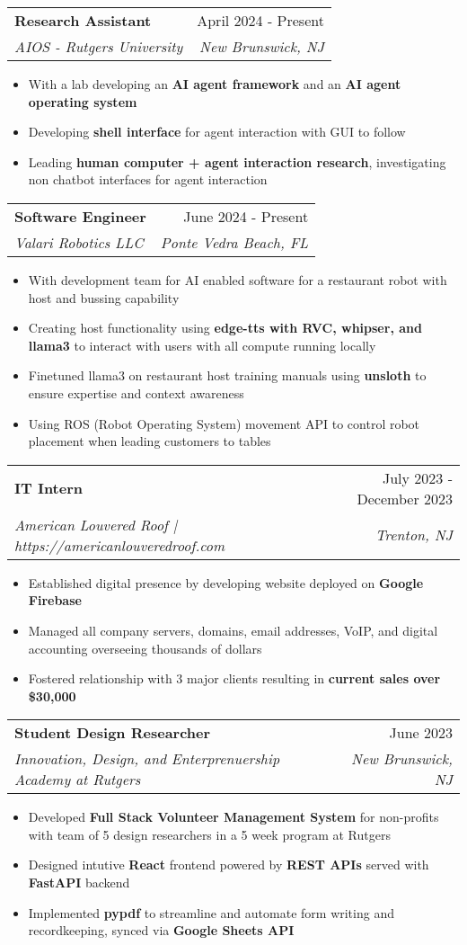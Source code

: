 \documentclass[letterpaper,10pt]{article}
\makeatletter
\newcommand{\resumeItem}[1]{
  \item\small{
    {#1 \vspace{-2pt}}
  }
}
\newcommand{\resumeSubheading}[4]{
  \vspace{-2pt}\item
    \begin{tabular*}{0.97\textwidth}[t]{l@{\extracolsep{\fill}}r}
      \textbf{#1} & #2 \\
      \textit{\small#3} & \textit{\small #4} \\
    \end{tabular*}\vspace{-7pt}
}
\newcommand{\resumeSubSubheading}[2]{
    \item
    \begin{tabular*}{0.97\textwidth}{l@{\extracolsep{\fill}}r}
      \textit{\small#1} & \textit{\small #2} \\
    \end{tabular*}\vspace{-7pt}
}
\newcommand{\resumeSubHeadingListEnd}{\end{itemize}}
\newcommand{\resumeItemListStart}{\begin{itemize}}
\newcommand{\resumeItemListEnd}{\end{itemize}\vspace{-5pt}}
\makeatother
\begin{document}
      
    \resumeSubheading
      {Research Assistant}{April 2024 - Present}
      {AIOS - Rutgers University}{New Brunswick, NJ}
      \resumeItemListStart
        \resumeItem{With a lab developing an \textbf{AI agent framework} and an \textbf{AI agent operating system}}
	\resumeItem{Developing \textbf{shell interface} for agent interaction with GUI to follow}
        \resumeItem{Leading \textbf{human computer + agent interaction research}, investigating non chatbot interfaces for agent interaction}
    \resumeItemListEnd

    \resumeSubheading
      {Software Engineer}{June 2024 - Present}
      {Valari Robotics LLC}{Ponte Vedra Beach, FL}
      \resumeItemListStart
        \resumeItem{With development team for AI enabled software for a restaurant robot with host and bussing capability}
	\resumeItem{Creating host functionality using \textbf{edge-tts with RVC, whipser, and llama3} to interact with users with all compute running locally}
        \resumeItem{Finetuned llama3 on restaurant host training manuals using \textbf{unsloth} to ensure expertise and context awareness}
        \resumeItem{Using ROS (Robot Operating System) movement API to control robot placement when leading customers to tables}
    \resumeItemListEnd

    \resumeSubheading
      {IT Intern}{July 2023 - December 2023}
      {American Louvered Roof  | https://americanlouveredroof.com}{Trenton, NJ}
      \resumeItemListStart
      \resumeItem{Established digital presence by developing website deployed on \textbf{Google Firebase}}
        \resumeItem{Managed all company servers, domains, email addresses, VoIP, and digital accounting overseeing thousands of dollars}
        \resumeItem{Fostered relationship with 3 major clients resulting in \textbf{current sales over \$30,000}}
    \resumeItemListEnd

    \resumeSubheading
      {Student Design Researcher}{June 2023}
      {Innovation, Design, and Enterprenuership Academy at Rutgers}{New Brunswick, NJ}
      \resumeItemListStart
      \resumeItem{Developed \textbf{Full Stack Volunteer Management System} for non-profits with team of 5 design researchers in a 5 week program at Rutgers}
      \resumeItem{Designed intutive \textbf{React} frontend powered by \textbf{REST APIs} served with \textbf{FastAPI} backend}
      \resumeItem{Implemented \textbf{pypdf} to streamline and automate form writing and recordkeeping, synced via \textbf{Google Sheets API}}
      \resumeItemListEnd
\end{document}
